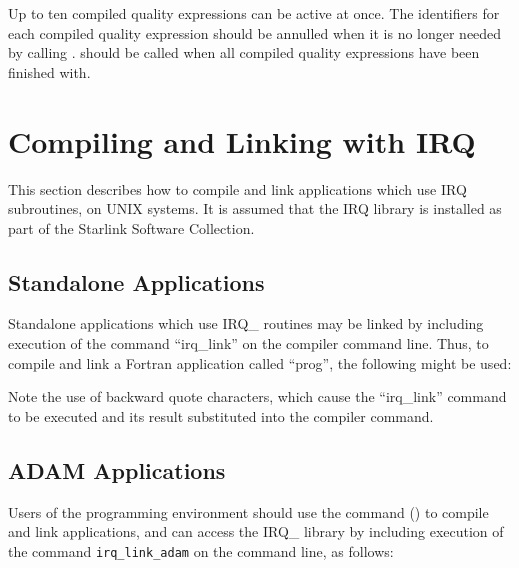 \documentclass[twoside,11pt,nolof]{starlink}
\begin{document}
Up to ten compiled quality expressions can be active at once. The
identifiers for each compiled quality expression should be annulled
when it is no longer needed by calling
. 
should be called when all compiled quality expressions have been
finished with.

\section {Compiling and Linking with IRQ}
\label{SEC:LINK}
This section describes how to compile and link applications which use IRQ
subroutines, on UNIX systems. It is assumed that the IRQ library
is installed as part of the Starlink Software Collection.


\subsection{Standalone Applications}
Standalone applications which use IRQ\_ routines may be linked by
including execution of the command ``irq\_link'' on the compiler
command line. Thus, to compile and link a Fortran application called
``prog'', the following might be used:

\begin{small}
\begin{terminalv}
\end{terminalv}
\end{small}

Note the use of backward quote characters, which cause the
``irq\_link'' command to be executed and its result substituted into
the compiler command.

\subsection{\label{ss:buildingadamapplications}ADAM Applications}
Users of the  programming environment
 should use
the  command
() to compile and link applications, and can
access the IRQ\_ library by including execution of the command
\texttt{irq\_link\_adam} on the command line, as follows:

\begin{small}
\begin{terminalv}
\end{terminalv}
\end{small}
\end{document}
